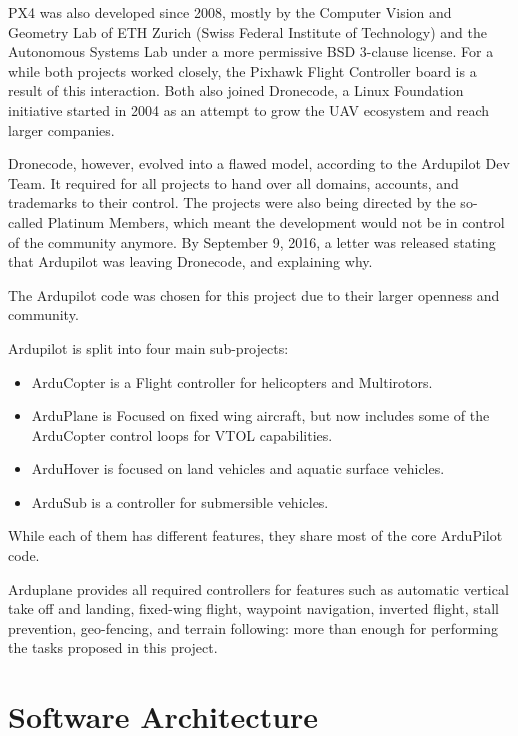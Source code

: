 PX4 was also developed since 2008\cite{waybackmachine}, mostly by the Computer Vision and Geometry Lab of ETH Zurich (Swiss Federal Institute of Technology)\cite{computervision} and the Autonomous Systems Lab\cite{autonomouslab} under a more permissive BSD 3-clause license\cite{bsd}.
%
For a while both projects worked closely, the Pixhawk Flight Controller board is a result of this interaction.
%
Both also joined Dronecode\cite{dronecode}, a Linux Foundation\cite{linuxfoundation} initiative started in 2004 as an attempt to grow the UAV ecosystem and reach larger companies.
%

Dronecode, however, evolved into a flawed model, according to the Ardupilot Dev Team.
%
It required for all projects to hand over all domains, accounts, and trademarks to their control.
%
The projects were also being directed by the so-called Platinum Members, which meant the development would not be in control of the community anymore.
%
By September 9, 2016, a letter was released stating that Ardupilot was leaving Dronecode, and explaining why\cite{letter}.

The Ardupilot code was chosen for this project due to their larger openness and community.

Ardupilot is split into four main sub-projects:
\begin{itemize}
\item ArduCopter is a Flight controller for helicopters and Multirotors.
\item ArduPlane is Focused on fixed wing aircraft, but now includes some of the ArduCopter control loops for VTOL capabilities.
\item ArduHover is focused on land vehicles and aquatic surface vehicles.
\item ArduSub is a controller for submersible vehicles.
\end{itemize}

While each of them has different features, they share most of the core ArduPilot code.

Arduplane provides all required controllers for features such as automatic vertical take off and landing, fixed-wing flight, waypoint navigation, inverted flight, stall prevention, geo-fencing, and terrain following: more than enough for performing the tasks proposed in this project.

\section{Software Architecture}

